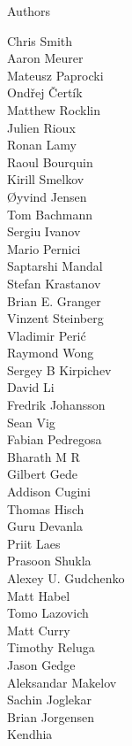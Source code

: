 \documentclass[xcolor=svgnames]{beamer}
\begin{document}
\begin{frame}{Authors}
  \begin{multicols}{5}
    \tiny
    Chris Smith\\
    Aaron Meurer\\
    Mateusz Paprocki\\
    Ondřej Čertík\\
    Matthew Rocklin\\
    Julien Rioux\\
    Ronan Lamy\\
    Raoul Bourquin\\
    Kirill Smelkov\\
    Øyvind Jensen\\
    Tom Bachmann\\
    Sergiu Ivanov\\
    Mario Pernici\\
    Saptarshi Mandal\\
    Stefan Krastanov\\
    Brian E. Granger\\
    Vinzent Steinberg\\
    Vladimir Perić\\
    Raymond Wong\\
    Sergey B Kirpichev\\
    David Li\\
    Fredrik Johansson\\
    Sean Vig\\
    Fabian Pedregosa\\
    Bharath M R\\
    Gilbert Gede\\
    Addison Cugini\\
    Thomas Hisch\\
    Guru Devanla\\
    Priit Laes\\
    Prasoon Shukla\\
    Alexey U. Gudchenko\\
    Matt Habel\\
    Tomo Lazovich\\
    Matt Curry\\
    Timothy Reluga\\
    Jason Gedge\\
    Aleksandar Makelov\\
    Sachin Joglekar\\
    Brian Jorgensen\\
    Kendhia\\

\end{multicols}
\end{frame}
\end{document}
